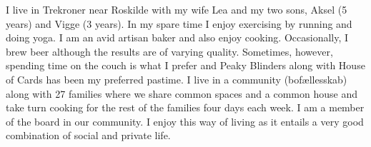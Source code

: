 



%
% 


% 

\begin{cventries}

\cventry
{} %
{} %
{}%
{} %
{ %
I live in Trekroner near Roskilde with my wife Lea and my two sons, Aksel (5 years) and Vigge (3 years). In my spare time I enjoy exercising by running and doing yoga. I am an avid artisan baker and also enjoy cooking. Occasionally, I brew beer although the results are of varying quality. Sometimes, however, spending time on the couch is what I prefer and Peaky Blinders along with House of Cards has been my preferred pastime. I live in a community (bofællesskab) along with 27 families where we share common spaces and a common house and take turn cooking for the rest of the families four days each week. I am a member of the board in our community. I enjoy this way of living as it entails a very good combination of social and private life.
}






\end{cventries}
